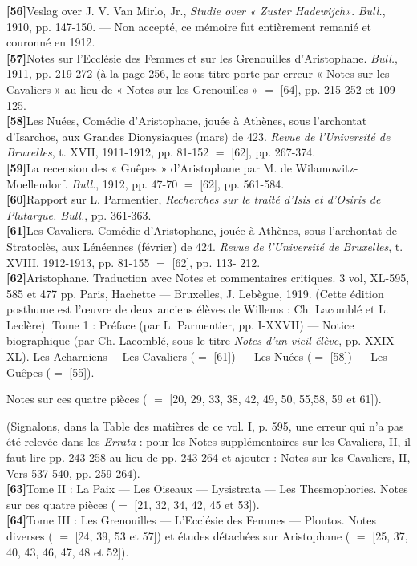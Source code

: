 \documentclass{book}%
\newcommand{\italique}[1]{\textit{#1}}%
\newcommand{\biblio}[2]{\hspace*{-1.5cm}\textbf{[#1]}\hspace*{1.5cm}#2\\

}
\begin{document}
\biblio{56}{Veslag over J. V. Van Mirlo, Jr., \italique{Studie over « Zuster Hadewijch»}. \italique{Bull.}, 1910, pp. 147-150. — Non accepté, ce mémoire fut entièrement remanié et couronné en 1912.}%
\biblio{57}{Notes sur l'Ecclésie des Femmes et sur les Grenouilles d'Aristophane. \italique{Bull.}, 1911, pp. 219-272 (à la page 256, le sous-titre porte par erreur « Notes sur les Cavaliers » au lieu de « Notes sur les Grenouilles »  $=$ [64], pp. 215-252 et 109-125.}%
\biblio{58}{Les Nuées, Comédie d'Aristophane, jouée à Athènes, sous l'archontat d'Isarchos, aux Grandes Dionysiaques (mars) de 423. \italique{Revue de l'Université de Bruxelles}, t. XVII, 1911-1912, pp. 81-152 $=$ [62], pp. 267-374.}%
\biblio{59}{La recension des « Guêpes » d'Aristophane par M. de Wilamowitz-Moellendorf. \italique{Bull.}, 1912, pp. 47-70 $=$ [62], pp. 561-584.}%
\biblio{60}{Rapport sur L. Parmentier, \italique{Recherches sur le traité d'Isis et d'Osiris de Plutarque. Bull.}, pp. 361-363.}%
\biblio{61}{Les Cavaliers. Comédie d'Aristophane, jouée à Athènes, sous l'archontat de Stratoclès, aux Lénéennes (février) de 424. \italique{Revue de l'Université de Bruxelles}, t. XVIII, 1912-1913, pp. 81-155 $=$ [62], pp. 113- 212.}%
\biblio{62}{Aristophane. Traduction avec Notes et commentaires critiques. 3 vol, XL-595, 585 et 477 pp. Paris, Hachette — Bruxelles, J. Lebègue, 1919. (Cette édition posthume est l'œuvre de deux anciens élèves de Willems : Ch. Lacomblé et L. Leclère). Tome 1 : Préface (par L. Parmentier, pp. I-XXVII) — Notice biographique (par Ch. Lacomblé, sous le titre \italique{Notes d'un vieil élève}, pp. XXIX-XL). 
Les Acharniens— Les Cavaliers ($=$ [61]) — Les Nuées ($=$ [58]) — Les Guêpes ($=$ [55]). 

Notes sur ces quatre pièces ( $=$ [20, 29, 33, 38, 42, 49, 50, 55,58, 59 et 61]). 

(Signalons, dans la Table des matières de ce vol. I, p. 595, une erreur qui n'a pas été relevée dans les \italique{Errata} : pour les Notes supplémentaires sur les Cavaliers, II, il faut lire pp. 243-258 au lieu de pp. 243-264 et ajouter : Notes sur les Cavaliers, II, Vers 537-540, pp. 259-264).}%
\biblio{63}{Tome II : La Paix — Les Oiseaux — Lysistrata — Les Thesmophories. Notes sur ces quatre pièces ($=$ [21, 32, 34, 42, 45 et 53]).}%
\biblio{64}{Tome III : Les Grenouilles — L'Ecclésie des Femmes — Ploutos. Notes diverses ( $=$ [24, 39, 53 et 57]) et études détachées sur Aristophane ( $=$ [25, 37, 40, 43, 46, 47, 48 et 52]).}%
\end{document}
